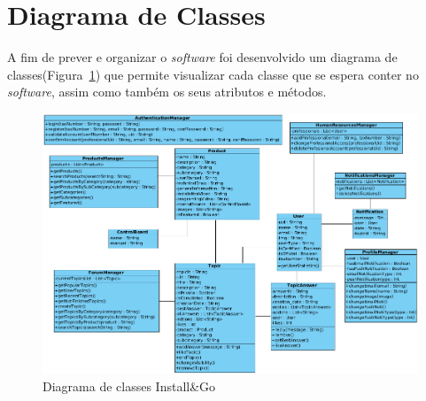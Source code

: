 \section{Diagrama de Classes}

A fim de prever e organizar o \textit{software} foi desenvolvido um diagrama de classes(Figura~\ref{fig:22}) que permite visualizar cada classe que se espera conter no \textit{software}, assim como também os seus atributos e métodos.

\begin{figure}[htb]
    \centering
    
    \includegraphics[width=\textwidth]{images/diagramas/diagrama_classes.png}
    \caption{Diagrama de classes Install\&Go}
    \label{fig:22}
\end{figure}
